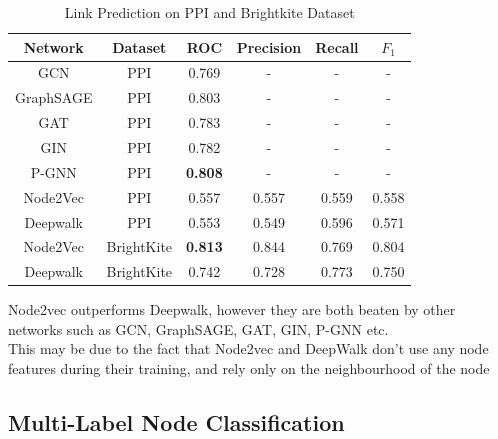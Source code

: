 \documentclass[sigconf]{acmart}
\begin{document}
\begin{table}[h]
\begin{center}
\begin{tabular}{ c|c|c|c|c|c } 
\textbf{Network} & \textbf{Dataset} & \textbf{ROC} & \textbf{Precision} & \textbf{Recall} & \textbf{$F_{1}$} \\ 
 \hline
 GCN\cite{kipf2016semi} & PPI &  0.769 & - & - & - \\
 GraphSAGE\cite{hamilton2017inductive} & PPI & 0.803 & - & - & - \\
 GAT\cite{velivckovic2017graph} & PPI &  0.783 & - & - & - \\
 GIN\cite{wang2019knowledge} & PPI & 0.782 & - & - & - \\
 P-GNN\cite{you2019position} & PPI & \textbf{0.808} & - & - & - \\
 \hline
 Node2Vec\cite{node2vec-kdd2016} & PPI & 0.557 & 0.557 & 0.559 & 0.558  \\ 
 Deepwalk\cite{Perozzi:2014:DOL:2623330.2623732} & PPI & 0.553 & 0.549 & 0.596 & 0.571  \\
 \hline
 \hline
 Node2Vec\cite{node2vec-kdd2016} & BrightKite & \textbf{0.813} & 0.844 & 0.769 & 0.804  \\ 
 Deepwalk\cite{Perozzi:2014:DOL:2623330.2623732} & BrightKite & 0.742 & 0.728 & 0.773 & 0.750

\end{tabular}
\end{center}
\caption{Link Prediction on PPI and Brightkite Dataset}
\label{tab:res2}
\end{table}

Node2vec outperforms Deepwalk, however they are both beaten by other networks such as GCN, GraphSAGE, GAT, GIN, P-GNN etc. \\
This may be due to the fact that Node2vec and DeepWalk don't use any node features during their training, and rely only on the neighbourhood of the node

\subsection{Multi-Label Node Classification}
\end{document}
